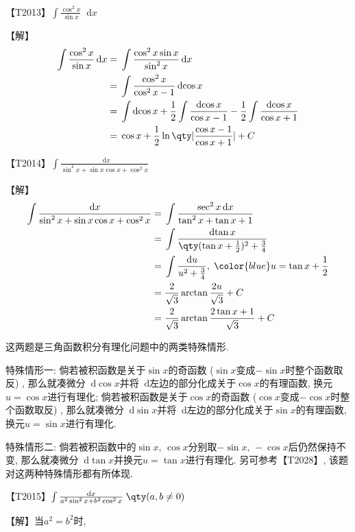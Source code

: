 \documentclass{ctexbook}
\newcommand*{\dif}{\mathop{}\!\mathrm{d}}
\begin{document}
{\begin{align*}
\end{align*}\par
{\color{red}【T2013】}$\int\frac{\cos^{2}{x}}{\sin{x}}\dif{x}$\par
【解】
\begin{align*}
\int\frac{\cos^{2}{x}}{\sin{x}}\dif{x}={}&\int\frac{\cos^{2}{x}\sin{x}}{\sin^{2}{x}}\dif{x}\\
={}&\int\frac{\cos^{2}{x}}{\cos^{2}{x}-1}\dif{\cos{x}}\\
={}&\int\dif{\cos{x}}+\frac{1}{2}\int\frac{\dif{\cos{x}}}{\cos{x}-1}-\frac{1}{2}\int\frac{\dif{\cos{x}}}{\cos{x}+1}\\
={}&\cos{x}+\frac{1}{2}\ln\qty|\frac{\cos{x}-1}{\cos{x}+1}|+C
\end{align*}\par
{\color{red}【T2014】}$\int\frac{\dif{x}}{\sin^{2}{x}+\sin{x}\cos{x}+\cos^{2}{x}}$\par
【解】
\begin{align*}
\int\frac{\dif{x}}{\sin^{2}{x}+\sin{x}\cos{x}+\cos^{2}{x}}={}&\int\frac{\sec^{2}{x}\dif{x}}{\tan^{2}{x}+\tan{x}+1}\\
={}&\int\frac{\dif{\tan{x}}}{\qty(\tan{x}+\frac{1}{2})^{2}+\frac{3}{4}}\\
={}&\int\frac{\dif{u}}{u^{2}+\frac{3}{4}},\;{\color{blue}u=\tan{x}+\frac{1}{2}}\\
={}&\frac{2}{\sqrt{3}}\arctan{\frac{2u}{\sqrt{3}}}+C\\
={}&\frac{2}{\sqrt{3}}\arctan{\frac{2\tan{x}+1}{\sqrt{3}}}+C
\end{align*}\par
{\kaishu 这两题是三角函数积分有理化问题中的两类特殊情形. \par
特殊情形一: 倘若被积函数是关于$\sin{x}$的奇函数 ($\sin{x}$变成$-\sin{x}$时整个函数取反) , 那么就凑微分$\dif{\cos{x}}$并将$\dif$左边的部分化成关于$\cos{x}$的有理函数, 换元$u=\cos{x}$进行有理化; 倘若被积函数是关于$\cos{x}$的奇函数 ($\cos{x}$变成$-\cos{x}$时整个函数取反) , 那么就凑微分$\dif{\sin{x}}$并将$\dif$左边的部分化成关于$\sin{x}$的有理函数, 换元$u=\sin{x}$进行有理化. \par
特殊情形二: 倘若被积函数中的$\sin{x},\,\cos{x}$分别取$-\sin{x},\,-\cos{x}$后仍然保持不变, 那么就凑微分$\dif{\tan{x}}$并换元$u=\tan{x}$进行有理化. 另可参考{\color{red}【T2028】}, 该题对这两种特殊情形都有所体现. \par}
{\color{red}【T2015】}$\int\frac{\dif{x}}{a^{2}\sin^{2}{x}+b^{2}\cos^{2}{x}}\;\qty(a,b\ne0)$\par
【解】当$a^{2}=b^{2}$时, 
\begin{align*}

\end{align*}}
\end{document}
